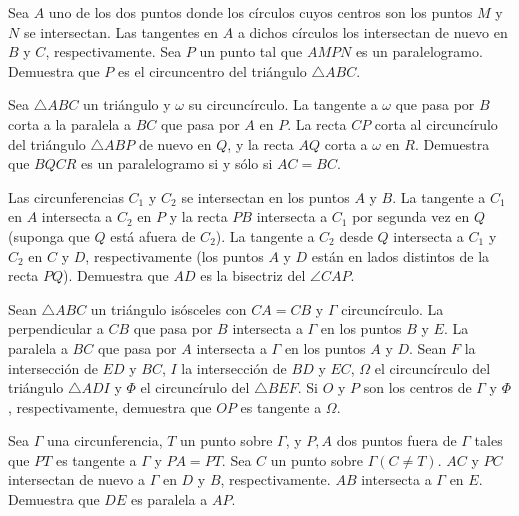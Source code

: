 \documentclass{article}
\begin{document}
\begin{ejercicio}
    Sea $A$ uno de los dos puntos donde los círculos cuyos centros son los
    puntos $M$ y $N$ se intersectan. Las tangentes en $A$ a dichos círculos
    los intersectan de nuevo en $B$ y $C$, respectivamente. Sea $P$ un punto
    tal que $AMPN$ es un paralelogramo. Demuestra que $P$ es el circuncentro
    del triángulo $\triangle ABC$.
\end{ejercicio}

\begin{ejercicio}
    Sea $\triangle ABC$ un triángulo y $\omega$ su circuncírculo. La tangente
    a $\omega$ que pasa por $B$ corta a la paralela a $BC$ que pasa por $A$
    en $P$. La recta $CP$ corta al circuncírulo del triángulo $\triangle ABP$
    de nuevo en $Q$, y la recta $AQ$ corta a $\omega$ en $R$. Demuestra que
    $BQCR$ es un paralelogramo si y sólo si $AC = BC$.
\end{ejercicio}

\begin{ejercicio}
    Las circunferencias $C_1$ y $C_2$ se intersectan en los puntos $A$ y 
    $B$. La tangente a $C_1$ en $A$ intersecta a $C_2$ en $P$ y la recta
    $PB$ intersecta a $C_1$ por segunda vez en $Q$ (suponga que $Q$ está
    afuera de $C_2$). La tangente a $C_2$ desde $Q$ intersecta a $C_1$ y $C_2$
    en $C$ y $D$, respectivamente (los puntos $A$ y $D$ están en lados distintos
    de la recta $PQ$). Demuestra que $AD$ es la bisectriz del $\angle CAP$.
\end{ejercicio}

\begin{ejercicio}
    Sean $\triangle ABC$ un triángulo isósceles con $CA = CB$ y $\Gamma$
    circuncírculo. La perpendicular a $CB$ que pasa por $B$ intersecta a 
    $\Gamma$ en los puntos $B$ y $E$. La paralela a $BC$ que pasa 
    por $A$ intersecta a $\Gamma$ en los puntos $A$ y $D$. Sean $F$ la 
    intersección de $ED$ y $BC$, $I$ la intersección de $BD$ y $EC$, 
    $\Omega$ el circuncírculo del triángulo $\triangle ADI$ y $\Phi$ 
    el circuncírulo del $\triangle BEF$. Si $O$ y $P$ son los centros de 
    $\Gamma$ y $\Phi$, respectivamente, demuestra que $OP$ es tangente a 
    $\Omega$.
\end{ejercicio}

\begin{ejercicio}
    Sea $\Gamma$ una circunferencia, $T$ un punto sobre $\Gamma$, y $P, A$
    dos puntos fuera de $\Gamma$ tales que $PT$ es tangente a $\Gamma$ y 
    $PA = PT$. Sea $C$ un punto sobre $\Gamma (C \neq T)$. $AC$ y $PC$
    intersectan de nuevo a $\Gamma$ en $D$ y $B$, respectivamente. $AB$
    intersecta a $\Gamma$ en $E$. Demuestra que $DE$ es paralela a $AP$.
\end{ejercicio}
\end{document}

